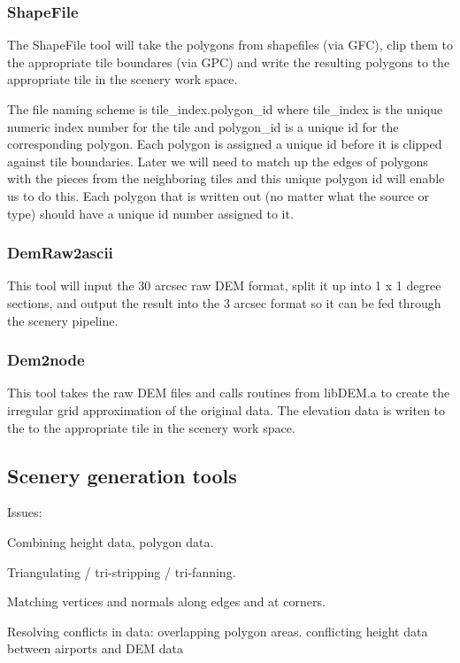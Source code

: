 \documentclass[12pt]{article}
\begin{document}
\subsubsection{ShapeFile}

The ShapeFile tool will take the polygons from shapefiles (via GFC),
clip them to the appropriate tile boundares (via GPC) and write the
resulting polygons to the appropriate tile in the scenery work space.

The file naming scheme is tile\_index.polygon\_id where tile\_index is
the unique numeric index number for the tile and polygon\_id is a
unique id for the corresponding polygon.  Each polygon is assigned a
unique id before it is clipped against tile boundaries.  Later we will
need to match up the edges of polygons with the pieces from the
neighboring tiles and this unique polygon id will enable us to do
this.  Each polygon that is written out (no matter what the source or
type) should have a unique id number assigned to it.

\subsubsection{DemRaw2ascii}

This tool will input the 30 arcsec raw DEM format, split it up into 1
x 1 degree sections, and output the result into the 3 arcsec format so
it can be fed through the scenery pipeline.

\subsubsection{Dem2node}

This tool takes the raw DEM files and calls routines from libDEM.a to
create the irregular grid approximation of the original data.  The
elevation data is writen to the to the appropriate tile in the scenery
work space.

\subsection{Scenery generation tools}

Issues:

Combining height data, polygon data.

Triangulating / tri-stripping / tri-fanning.

Matching vertices and normals along edges and at corners.

Resolving conflicts in data:
  overlapping polygon areas.
  conflicting height data between airports and DEM data
\end{document}
